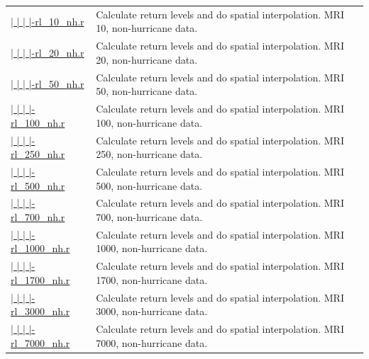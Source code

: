 \documentclass[12pt,oneside]{reedthesis}
\begin{document}
\begin{longtable}[t]{>{\raggedright\arraybackslash}p{1.3in}>{\raggedright\arraybackslash}p{4.9in}}
\href{ftp://ftp.geocorp.co/windthesis/code/pot_pp/isd/maps/return_levels_10_nh.r}{  |    |    |    |-rl\_10\_nh.r} & Calculate return levels and do spatial interpolation. MRI 10, non-hurricane data.\\
\href{ftp://ftp.geocorp.co/windthesis/code/pot_pp/isd/maps/return_levels_20_nh.r}{  |    |    |    |-rl\_20\_nh.r} & Calculate return levels and do spatial interpolation. MRI 20, non-hurricane data.\\
\href{ftp://ftp.geocorp.co/windthesis/code/pot_pp/isd/maps/return_levels_50_nh.r}{  |    |    |    |-rl\_50\_nh.r} & Calculate return levels and do spatial interpolation. MRI 50, non-hurricane data.\\
\href{ftp://ftp.geocorp.co/windthesis/code/pot_pp/isd/maps/return_levels_100_nh.r}{  |    |    |    |-rl\_100\_nh.r} & Calculate return levels and do spatial interpolation. MRI 100, non-hurricane data.\\
\href{ftp://ftp.geocorp.co/windthesis/code/pot_pp/isd/maps/return_levels_250_nh.r}{  |    |    |    |-rl\_250\_nh.r} & Calculate return levels and do spatial interpolation. MRI 250, non-hurricane data.\\
\href{ftp://ftp.geocorp.co/windthesis/code/pot_pp/isd/maps/return_levels_500_nh.r}{  |    |    |    |-rl\_500\_nh.r} & Calculate return levels and do spatial interpolation. MRI 500, non-hurricane data.\\
\href{ftp://ftp.geocorp.co/windthesis/code/pot_pp/isd/maps/return_levels_700_nh.r}{  |    |    |    |-rl\_700\_nh.r} & Calculate return levels and do spatial interpolation. MRI 700, non-hurricane data.\\
\href{ftp://ftp.geocorp.co/windthesis/code/pot_pp/isd/maps/return_levels_1000_nh.r}{  |    |    |    |-rl\_1000\_nh.r} & Calculate return levels and do spatial interpolation. MRI 1000, non-hurricane data.\\
\href{ftp://ftp.geocorp.co/windthesis/code/pot_pp/isd/maps/return_levels_1700_nh.r}{  |    |    |    |-rl\_1700\_nh.r} & Calculate return levels and do spatial interpolation. MRI 1700, non-hurricane data.\\
\href{ftp://ftp.geocorp.co/windthesis/code/pot_pp/isd/maps/return_levels_3000_nh.r}{  |    |    |    |-rl\_3000\_nh.r} & Calculate return levels and do spatial interpolation. MRI 3000, non-hurricane data.\\
\href{ftp://ftp.geocorp.co/windthesis/code/pot_pp/isd/maps/return_levels_7000_nh.r}{  |    |    |    |-rl\_7000\_nh.r} & Calculate return levels and do spatial interpolation. MRI 7000, non-hurricane data.\\

\end{longtable}
\end{document}
